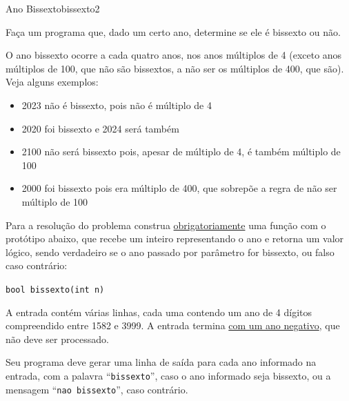 \documentclass[12pt,a4paper,oneside]{article}
\begin{document}
\begin{problem}{Ano Bissexto}{bissexto}{2}

Faça um programa que, dado um certo ano, determine se ele é bissexto ou não.

O ano bissexto ocorre a cada quatro anos, nos anos múltiplos de 4 (exceto anos múltiplos de 100, que não são bissextos, a não ser os múltiplos de 400, que são). Veja alguns exemplos:

\vspace{-6pt}
\begin{itemize}
\item 2023 não é bissexto, pois não é múltiplo de 4
\vspace{-6pt}
\item 2020 foi bissexto e 2024 será também
\vspace{-6pt}
\item 2100 não será bissexto pois, apesar de múltiplo de 4, é também múltiplo de 100
\vspace{-6pt}
\item 2000 foi bissexto pois era múltiplo de 400, que sobrepõe a regra de não ser múltiplo de 100
\end{itemize}
\vspace{-6pt}

Para a resolução do problema construa \underline{obrigatoriamente} uma função com o protótipo abaixo, que recebe um inteiro representando o ano e retorna um valor lógico, sendo verdadeiro se o ano passado por parâmetro for bissexto, ou falso caso contrário:

\texttt{\textcolor{Mulberry}{bool} bissexto(\textcolor{Mulberry}{int} n)}

%

\InputFile

A entrada contém várias linhas, cada uma contendo um ano de 4 dígitos compreendido entre 1582 e 3999.
A entrada termina \underline{com um ano negativo}, que não deve ser processado.

\OutputFile

Seu programa deve gerar uma linha de saída para cada ano informado na entrada, com a palavra ``\texttt{bissexto}'', caso o ano informado seja bissexto, ou a mensagem ``\texttt{nao bissexto}'', caso contrário.


\Example

\begin{example}
%
\end{example}



\end{problem}
\end{document}
